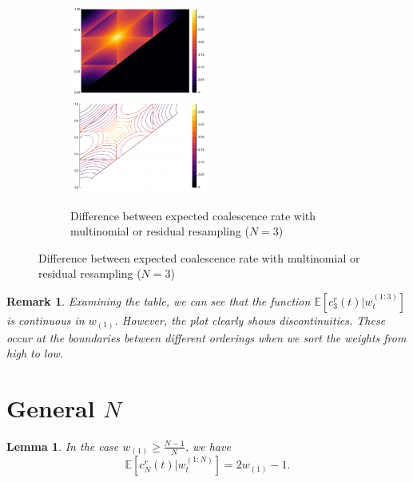 \documentclass[fleqn]{article}
\newtheorem{lemma}{Lemma}
\newtheorem{remark}{Remark}
\theoremstyle{definition}
\newcommand{\E}{\mathbb{E}}
\newcommand{\wt}[2][t]{w_{#1}^{(#2)}}
\begin{document}
\begin{figure}
\begin{subfigure}{\textwidth}
		\includegraphics[width=0.5\textwidth]{plots/EcN_mn_res_diff_N3_heatmap.pdf}
		\includegraphics[width=0.5\textwidth]{plots/EcN_mn_res_diff_N3_contour.pdf}
	\caption{Difference between expected coalescence rate with multinomial or residual resampling ($N=3$)}
	\end{subfigure}
\end{figure}

\begin{remark}
Examining the table, we can see that the function $\E[c_3^r(t) |\wt{1:3}]$ is continuous in $w_{(1)}$. However, the plot clearly shows discontinuities. These occur at the boundaries between different orderings when we sort the weights from high to low.
\end{remark}

\section*{General $N$}
\begin{lemma}
In the case $w_{(1)} \geq \frac{N-1}{N}$, we have 
\begin{equation*}
\E[c_N^r(t) |\wt{1:N}] = 2w_{(1)} -1.
\end{equation*}
\end{lemma}
\end{document}
